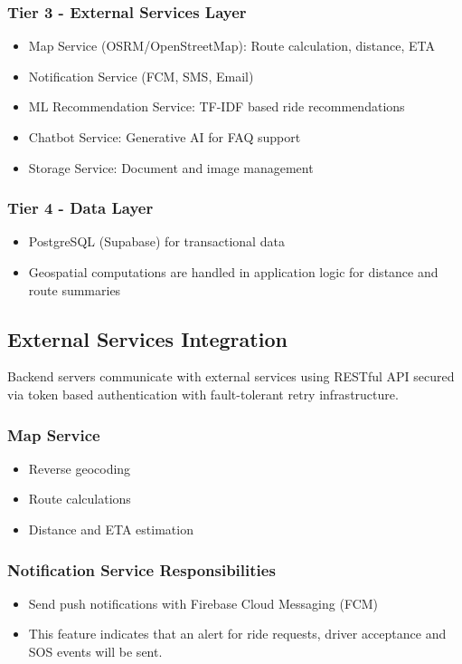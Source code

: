\subsubsection{Tier 3 - External Services Layer}
\begin{itemize}
    \item Map Service (OSRM/OpenStreetMap): Route calculation, distance, ETA
    \item Notification Service (FCM, SMS, Email)
    \item ML Recommendation Service: TF-IDF based ride recommendations
    \item Chatbot Service: Generative AI for FAQ support
    \item Storage Service: Document and image management
\end{itemize}

\subsubsection{Tier 4 - Data Layer}
\begin{itemize}
    \item PostgreSQL (Supabase) for transactional data
    \item Geospatial computations are handled in application logic for distance and route summaries
\end{itemize}

\subsection{External Services Integration}

Backend servers communicate with external services using RESTful API secured via token based authentication with fault-tolerant retry infrastructure.

\subsubsection{Map Service}
\begin{itemize}
    \item Reverse geocoding
    \item Route calculations
    \item Distance and ETA estimation
\end{itemize}

\subsubsection{Notification Service Responsibilities}
\begin{itemize}
    \item Send push notifications with Firebase Cloud Messaging (FCM)
    \item This feature indicates that an alert for ride requests, driver acceptance and SOS events will be sent.
\end{itemize}

